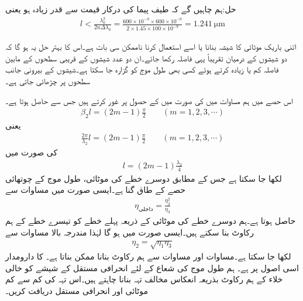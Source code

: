 حل:ہم چاہیں گے کہ طیف پیما کی  درکار قیمت سے قدر زیادہ ہو یعنی
\begin{align*}
l< \frac{\lambda_0^2}{2n\Delta \lambda_0}=\frac{600\times 10^{-9} \times 600 \times 10^{-9}}{2\times 1.45\times 100 \times 10^{-9}}=\SI{1.241}{\micro\meter}
\end{align*}

اتنی باریک موٹائی کا شیشہ بنانا یا اسے استعمال کرنا ناممکن سی بات ہے۔اس کا بہتر حل یہ ہو گا کہ دو شیشوں کے درمیان تقریباً یہی فاصلہ رکھا جائے۔ان دو عدد شیشوں کے قریبی سطحوں کے مابین فاصلہ کم یا زیادہ کرتے ہوئے کسی بھی طول موج کو گزارہ جا سکتا ہے۔شیشوں کے بیرونی جانب سطحوں پر  چڑھائی جاتی ہے۔

اس حصے میں ہم مساوات  میں  کی صورت میں  کے  حصول پر غور کرتے ہیں جس سے  حاصل ہوتا ہے۔
\begin{align*}
\beta_2 l =(2m-1)\frac{\pi}{2} \quad \quad (m=1,2,3,\cdots)
\end{align*}
یعنی
\begin{align*}
\frac{2\pi}{\lambda_2} l =(2m-1)\frac{\pi}{2} \quad \quad (m=1,2,3,\cdots)
\end{align*}
کی صورت میں 
\begin{align}\label{مساوات_مستوی_بے_انعکاس_الف}
l=(2m-1)\frac{\lambda_2}{4}
\end{align}
لکھا جا سکتا ہے جس کے مطابق دوسرے خطے کی موٹائی، طول موج کے چوتھائی حصے کے طاق گنا ہے۔ایسی صورت میں  مساوات  سے
\begin{align}
\eta_{\text{داخلی}}=\frac{\eta_2^2}{\eta_3}
\end{align}
حاصل ہوتا ہے۔ہم دوسرے خطے کی موٹائی کے ذریعہ پہلے خطے کو تیسرے خطے کے ہم رکاوٹ بنا سکتے ہیں۔ایسی صورت میں  ہو گا لہٰذا مندرجہ بالا مساوات سے
\begin{align}\label{مساوات_مستوی_بے_انعکاس_ب}
\eta_2=\sqrt{\eta_1 \eta_3}
\end{align}
لکھا جا سکتا ہے۔مساوات  اور مساوات   سے ہم رکاوٹ بنانا ممکن بناتا ہے۔  کا دارومدار اسی اصول پر ہے۔
ہم  طول موج کی شعاع کے لئے  انحرافی مستقل کے شیشے کو خالی خلاء  کے ہم رکاوٹ بذریعہ انعکاس مخالف تہہ بنانا چاہتے ہیں۔اس تہہ کی کم سے کم موٹائی اور انحرافی مستقل  دریافت کریں۔  

